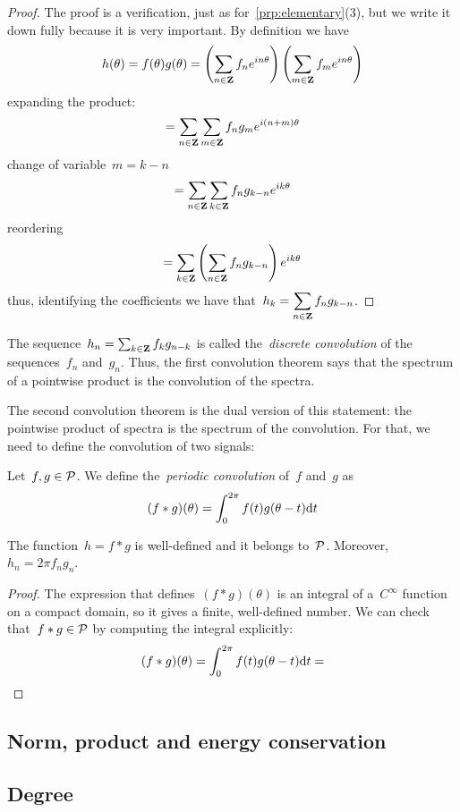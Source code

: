 \begin{proof}
	The proof is a verification, just as for~\ref{prp:elementary}(3), but
	we write it down fully because it is very important.  By definition we
	have
	\[
		h(\theta)=f(\theta)g(\theta)
		=
		\left(\sum_{n\in\mathbf{Z}}f_ne^{in\theta}\right)
		\left(\sum_{m\in\mathbf{Z}}f_me^{in\theta}\right)
	\]
	expanding the product:
	\[
		=
		\sum_{n\in\mathbf{Z}}\sum_{m\in\mathbf{Z}} f_n g_m e^{i(n+m)\theta}
	\]
	change of variable~$m=k-n$
	\[
		=\sum_{n\in\mathbf{Z}}\sum_{k\in\mathbf{Z}} f_n g_{k-n} e^{ik\theta}
	\]
	reordering
	\[
		=\sum_{k\in\mathbf{Z}}\left(\sum_{n\in\mathbf{Z}} f_n g_{k-n}\right)e^{ik\theta}
	\]
	thus, identifying the coefficients we have
	that~$\displaystyle h_k=\sum_{n\in\mathbf{Z}} f_n g_{k-n}$.
\end{proof}

The sequence~$h_n=\sum_{k\in\mathbf{Z}} f_k g_{n-k}$ is called the~\emph{discrete
convolution} of the sequences~$f_n$ and~$g_n$.  Thus, the first convolution
theorem says that the spectrum of a pointwise product is the convolution of the
spectra.

The second convolution theorem is the dual version of this statement: the
pointwise product of spectra is the spectrum of the convolution.  For that, we
need to define the convolution of two signals:

\begin{definition}
	Let~$f,g\in\mathcal{P}$.  We define the~\emph{periodic convolution} of~$f$
	and~$g$ as
	\[
		(f*g)(\theta)=\int_0^{2\pi}f(t)g(\theta-t)\mathrm{d} t
	\]
\end{definition}

\begin{proposition}
	The function~$h=f*g$ is well-defined and it belongs to~$\mathcal{P}$.
	Moreover,~$h_n=2\pi f_n g_n$.
\end{proposition}

\begin{proof}
	The expression that defines~$(f*g)(\theta)$ is an integral of
	a~$C^\infty$ function on a compact domain, so it gives a finite,
	well-defined number.  We can check that~$f*g\in\mathcal{P}$ by computing the
	integral explicitly:
	\[
		(f*g)(\theta)=\int_0^{2\pi}f(t)g(\theta-t)\mathrm{d} t
		=
	\]
\end{proof}


\subsection{Norm, product and energy conservation}


\subsection{Degree}


